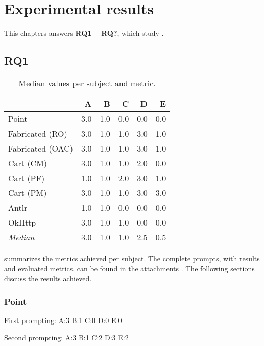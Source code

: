\chapter{Experimental results}\label{chap:results}

This chapters answers \textbf{RQ1 – RQ?}, which study .

\section{RQ1}\label{sec:results:rq1}

\begin{table}[t]
\centering
\begin{tabular}{@{\extracolsep{\fill}} lrrrrr} \toprule
                 & A & B & C & D & E \\
\midrule
Point            & 3.0 & 1.0 & 0.0 & 0.0 & 0.0 \\
Fabricated (RO)  & 3.0 & 1.0 & 1.0 & 3.0 & 1.0 \\
Fabricated (OAC) & 3.0 & 1.0 & 1.0 & 3.0 & 1.0 \\
Cart (CM)        & 3.0 & 1.0 & 1.0 & 2.0 & 0.0 \\
Cart (PF)        & 1.0 & 1.0 & 2.0 & 3.0 & 1.0 \\
Cart (PM)        & 3.0 & 1.0 & 1.0 & 3.0 & 3.0 \\
Antlr            & 1.0 & 1.0 & 0.0 & 0.0 & 0.0 \\
OkHttp           & 3.0 & 1.0 & 1.0 & 0.0 & 0.0 \\
\midrule
\textit{Median}  & 3.0 & 1.0 & 1.0 & 2.5 & 0.5 \\
\bottomrule
\end{tabular}
\caption{Median values per subject and metric.\label{tab:results:rq1}}
\end{table}

 summarizes the metrics achieved per subject.
The complete prompts, with results and evaluated metrics, can be found in the attachments .
The following sections discuss the results achieved.

\subsection{Point}

First prompting:
A:3
B:1
C:0
D:0
E:0

Second prompting:
A:3
B:1
C:2
D:3
E:2


